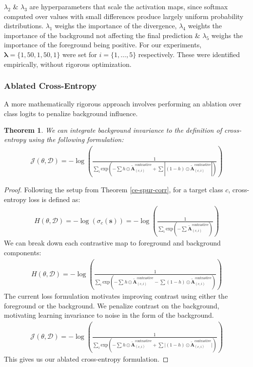 \documentclass{article}
\theoremstyle{plain}
\newtheorem{theorem}{Theorem}[section]
\theoremstyle{definition}
\theoremstyle{remark}
\begin{document}
$\lambda_2$ \& $\lambda_3$ are hyperparameters that scale the activation maps, since softmax computed over values with small differences produce largely uniform probability distributions. $\lambda_1$ weighs the importance of the divergence, $\lambda_4$ weights the importance of the background not affecting the final prediction \& $\lambda_5$ weighs the importance of the foreground being positive. For our experiments, $\bm{\lambda} = \{1, 50, 1, 50, 1\}$ were set for $i = \{1, \ldots, 5\}$ respectively. These were identified empirically, without rigorous optimization.

\subsubsection{Ablated Cross-Entropy}

A more mathematically rigorous approach involves performing an ablation over class logits to penalize background influence.

\begin{theorem}\label{ace}
	We can integrate background invariance to the definition of cross-entropy using the following formulation:
	\begin{gather}
		\mathcal{J}(\theta, \mathcal{D}) = -\log \left( \frac{1}{\sum_i \text{exp}\left(-\sum h \odot \tilde{\mathcal{\bm{A}}}^{\text{contrastive}}_{(c, i)} + \sum |(1-h) \odot \tilde{\mathcal{\bm{A}}}^{\text{contrastive}}_{(c, i)}|\right)} \right)
	\end{gather}
\end{theorem}
\begin{proof} Following the setup from Theorem \ref{ce-spur-corr}, for a target class $c$, cross-entropy loss is defined as:
	\begin{gather}
		H(\theta, \mathcal{D}) = -\log \left( \sigma_c(\bm{s}) \right) = -\log \left( \frac{1}{\sum_i \text{exp}({-\sum^{}\tilde{\mathcal{\bm{A}}}^{\text{contrastive}}_{(c, i)}})} \right)
	\end{gather}
	We can break down each contrastive map to foreground and background components:
	\begin{gather}
		H(\theta, \mathcal{D}) = -\log \left( \frac{1}{\sum_i \text{exp}\left({-\sum^{}h \odot \tilde{\mathcal{\bm{A}}}^{\text{contrastive}}_{(c, i)} - \sum (1-h) \odot \tilde{\mathcal{\bm{A}}}^{\text{contrastive}}_{(c, i)}}\right)} \right)
	\end{gather}
	The current loss formulation motivates improving contrast using either the foreground or the background. We penalize contrast on the background, motivating learning invariance to noise in the form of the background.
	\begin{gather}
		\mathcal{J}(\theta, \mathcal{D}) = -\log \left( \frac{1}{\sum_i \text{exp}\left({-\sum^{}h \odot \tilde{\mathcal{\bm{A}}}^{\text{contrastive}}_{(c, i)} + \sum |(1-h) \odot \tilde{\mathcal{\bm{A}}}^{\text{contrastive}}_{(c, i)}}|\right)} \right)
	\end{gather}
	This gives us our ablated cross-entropy formulation.
\end{proof}
\end{document}
